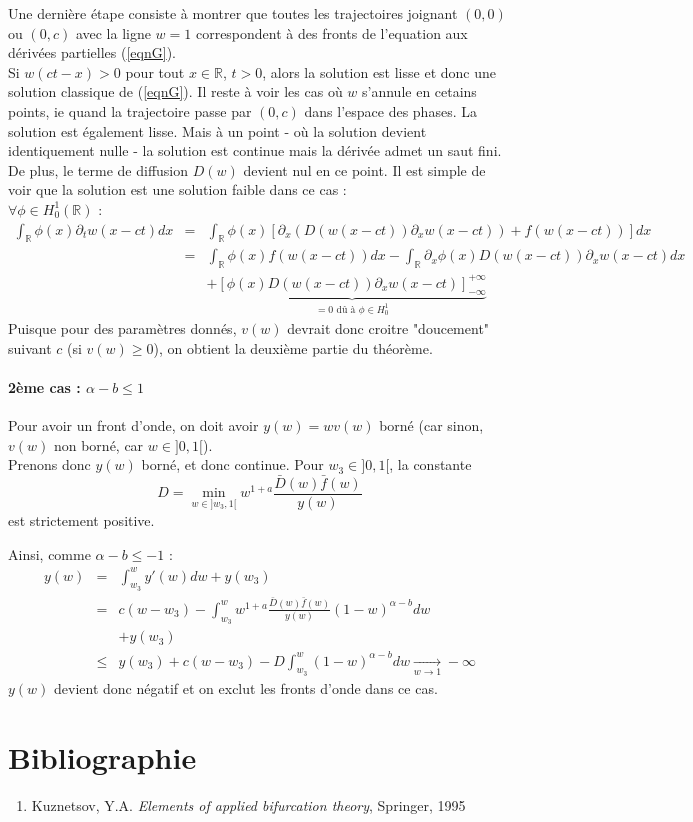 \documentclass{article}
\begin{document}
\bigskip
Une dernière étape consiste à montrer que toutes les trajectoires joignant $(0,0)$ ou $(0,c)$ avec la ligne $w=1$ correspondent à des fronts de l'equation aux dérivées partielles (\ref{eqnG}).\\
Si $w(ct-x)>0$ pour tout $x\in \mathbb{R}$, $t>0$, alors la solution est lisse et donc une solution classique de (\ref{eqnG}). Il reste à voir les cas où $w$ s'annule en cetains points, ie quand la trajectoire passe par $(0,c)$ dans l'espace des phases. La solution est également lisse. Mais à un point - où la solution devient identiquement nulle - la solution est continue mais la dérivée admet un saut fini. De plus, le terme de diffusion $D(w)$ devient nul en ce point. Il est simple de voir que la solution est une solution faible dans ce cas :\\
$\forall \phi\in H_0^1(\mathbb{R})$ :
\begin{eqnarray*}
	\int_{\mathbb{R}} \phi(x)\partial_t w(x-ct)dx &=&\int_{\mathbb{R}} \phi(x) \left[ \partial_x \left( D(w(x-ct))\partial_x w(x-ct)\right) +f(w(x-ct))\right]dx\\
						&=& \int_{\mathbb{R}} \phi(x) f(w(x-ct)) dx - \int_{\mathbb{R}} \partial_x \phi(x) D(w(x-ct))\partial_x w(x-ct)dx \\
						& & + \underbrace{\left[ \phi(x)D(w(x-ct))\partial_x w(x-ct)\right]_{-\infty}^{+\infty}}_{=0 \text{ dû à } \phi \in H_0^1}
\end{eqnarray*}
Puisque pour des paramètres donnés, $v(w)$ devrait donc croitre "doucement" suivant $c$ (si $v(w)\geq 0$), on obtient la deuxième partie du théorème.

\paragraph{2ème cas : $\alpha-b\leq 1$}
Pour avoir un front d'onde, on doit avoir $y(w)=wv(w)$ borné (car sinon, $v(w)$ non borné, car $w\in ]0,1[$).\\
Prenons donc $y(w)$ borné, et donc continue. Pour $w_3\in]0,1[$, la constante \[D=\min_{w\in ]w_3,1[} w^{1+a} \frac{\bar{D}(w)\bar{f}(w)}{y(w)}\] est strictement positive.

Ainsi, comme $\alpha-b\leq -1$ : 
\begin{eqnarray*}
	y(w)&=&\int_{w_3}^w y'(w)dw + y(w_3)\\
		&=& c(w-w_3)-\int_{w_3}^w w^{1+a} \frac{\bar{D}(w)\bar{f}(w)}{y(w)} (1-w)^{\alpha-b} dw \\& &+ y(w_3)\\
		&\leq& y(w_3)+c(w-w_3) -D \int_{w_3}^w (1-w)^{\alpha-b} dw \xrightarrow[w\to 1]{} -\infty
\end{eqnarray*}
$y(w)$ devient donc négatif et on exclut les fronts d'onde dans ce cas.


\appendix
\section{Bibliographie}
\begin{enumerate}
	\item \label{bib1} Kuznetsov, Y.A. \textit{Elements of applied bifurcation theory}, Springer, 1995
\end{enumerate}
\end{document}
